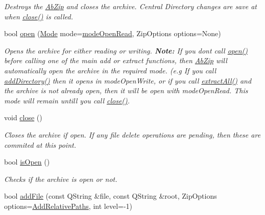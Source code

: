 \begin{DoxyCompactItemize}
\begin{DoxyCompactList}\small\item\em Destroys the \hyperlink{class_ab_zip}{Ab\+Zip} and closes the archive. Central Directory changes are save at when \hyperlink{class_ab_zip_a8a68479ea9a9b4ba18064eb4f011af83}{close()} is called. \end{DoxyCompactList}\item 
bool \hyperlink{class_ab_zip_ab57494eaad3a580c84dd66978e84db0c}{open} (\hyperlink{class_ab_zip_ad24114feac0d38566f6b36f5fc0db54e}{Mode} mode=\hyperlink{class_ab_zip_ad24114feac0d38566f6b36f5fc0db54eab1422ad58f4dcd50cff8ce563ec8a806}{mode\+Open\+Read}, Zip\+Options options=None)
\begin{DoxyCompactList}\small\item\em Opens the archive for either reading or writing. {\bfseries Note\+:} If you don\textquotesingle{}t call \hyperlink{class_ab_zip_ab57494eaad3a580c84dd66978e84db0c}{open()} before calling one of the main add or extract functions, then \hyperlink{class_ab_zip}{Ab\+Zip} will automatically open the archive in the required mode. (e.\+g If you call \hyperlink{class_ab_zip_adf2414a410a25ef82ac7349b0a2d1c97}{add\+Directory()} then it opens in mode\+Open\+Write, or if you call \hyperlink{class_ab_zip_ac32a9ad3665fea51a0d3977e251ade73}{extract\+All()} and the archive is not already open, then it will be open with mode\+Open\+Read. This mode will remain untill you call \hyperlink{class_ab_zip_a8a68479ea9a9b4ba18064eb4f011af83}{close()}. \end{DoxyCompactList}\item 
void \hyperlink{class_ab_zip_a8a68479ea9a9b4ba18064eb4f011af83}{close} ()
\begin{DoxyCompactList}\small\item\em Closes the archive if open. If any file delete operations are pending, then these are commited at this point. \end{DoxyCompactList}\item 
bool \hyperlink{class_ab_zip_aaa0b968b507346894fedb53519e40bba}{is\+Open} ()
\begin{DoxyCompactList}\small\item\em Checks if the archive is open or not. \end{DoxyCompactList}\item 
bool \hyperlink{class_ab_zip_a151daf4412c98f40a7608fd825689382}{add\+File} (const Q\+String \&file, const Q\+String \&root, Zip\+Options options=\hyperlink{class_ab_zip_a9c4f57d6b8d9a449c2eb6c4d4e53c9d5a9fe2234f7fddcfdae76f8aeb8c3c2d44}{Add\+Relative\+Paths}, int level=-\/1)

\end{DoxyCompactItemize}
